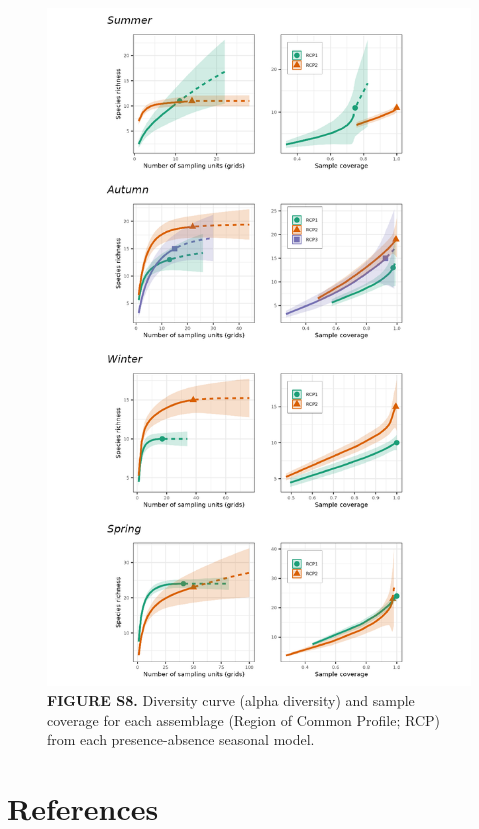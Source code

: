 \documentclass[
]{article}
\begin{document}
\begin{figure}
\centering
\includegraphics{../results/FigS8_iNEXT.png}
\caption{\textbf{FIGURE S8.} Diversity curve (alpha diversity) and
sample coverage for each assemblage (Region of Common Profile; RCP) from
each presence-absence seasonal model.}
\end{figure}

\newpage

\hypertarget{references}{%
\section*{References}\label{references}}
\end{document}
